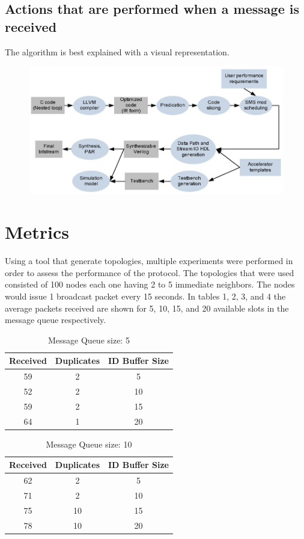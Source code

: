 \documentclass[a4paper]{article}
\begin{document}
\subsection{Actions that are performed when a message is received}

The algorithm is best explained with a visual representation.

\begin{figure}[h]
\includegraphics[width=0.7\linewidth]{figures/sopencl_generation.jpeg}
\end{figure}

\section{Metrics}

Using a tool that generate topologies, multiple experiments were performed in order to assess the performance
of the protocol. The topologies that were used consisted of 100 nodes each one having 2 to 5 immediate neighbors.
The nodes would issue 1 broadcast packet every 15 seconds. In tables 1, 2, 3, and 4 the
average packets received are shown for 5, 10, 15, and 20 available slots in the message queue respectively.

\begin{table}[H]
\centering
\begin{tabular}{|c|c|c|}
\hline
Received&	Duplicates& 	ID Buffer Size \\
\hline
59&	2	&	5 \\
\hline
52&	2	&	10 \\
\hline
59 &	2	&	15 \\
\hline
64&	1&	20 \\
\hline
\end{tabular}
\label{f1}
\caption{Message Queue size: 5}
\end{table}

\begin{table}[H]
\centering
\begin{tabular}{|c|c|c|}
\hline
Received&	Duplicates& 	ID Buffer Size \\
\hline

62 &	2	 &	5 \\
\hline

71 &	2	&	10 \\
\hline

75 &	10 &	15 \\
\hline

78 &	10 &	20 \\
\hline
\end{tabular}
\label{f2}
\caption{Message Queue size: 10}
\end{table}
\end{document}
